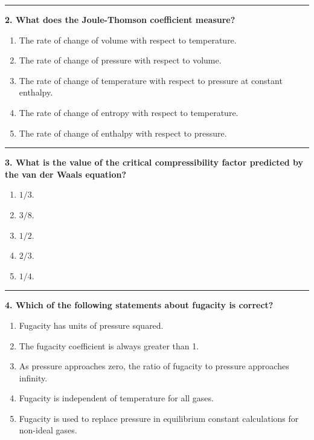 \documentclass[
  9pt,
]{extbook}
\providecommand{\tightlist}{%
  \setlength{\itemsep}{0pt}\setlength{\parskip}{0pt}}
\theoremstyle{definition}
\theoremstyle{definition}
\theoremstyle{definition}
\theoremstyle{definition}
\theoremstyle{remark}
\begin{document}
\begin{center}\rule{0.5\linewidth}{0.5pt}\end{center}

\textbf{2. What does the Joule-Thomson coefficient measure?}

\begin{enumerate}
\def\labelenumi{\alph{enumi}.}
\tightlist
\item
  The rate of change of volume with respect to temperature.
\item
  The rate of change of pressure with respect to volume.
\item
  The rate of change of temperature with respect to pressure at constant enthalpy.
\item
  The rate of change of entropy with respect to temperature.
\item
  The rate of change of enthalpy with respect to pressure.
\end{enumerate}

\begin{center}\rule{0.5\linewidth}{0.5pt}\end{center}

\textbf{3. What is the value of the critical compressibility factor predicted by the van der Waals equation?}

\begin{enumerate}
\def\labelenumi{\alph{enumi}.}
\tightlist
\item
  \(1/3\).
\item
  \(3/8\).
\item
  \(1/2\).
\item
  \(2/3\).
\item
  \(1/4\).
\end{enumerate}

\begin{center}\rule{0.5\linewidth}{0.5pt}\end{center}

\textbf{4. Which of the following statements about fugacity is correct?}

\begin{enumerate}
\def\labelenumi{\alph{enumi}.}
\tightlist
\item
  Fugacity has units of pressure squared.
\item
  The fugacity coefficient is always greater than 1.
\item
  As pressure approaches zero, the ratio of fugacity to pressure approaches infinity.
\item
  Fugacity is independent of temperature for all gases.
\item
  Fugacity is used to replace pressure in equilibrium constant calculations for non-ideal gases.
\end{enumerate}
\end{document}
